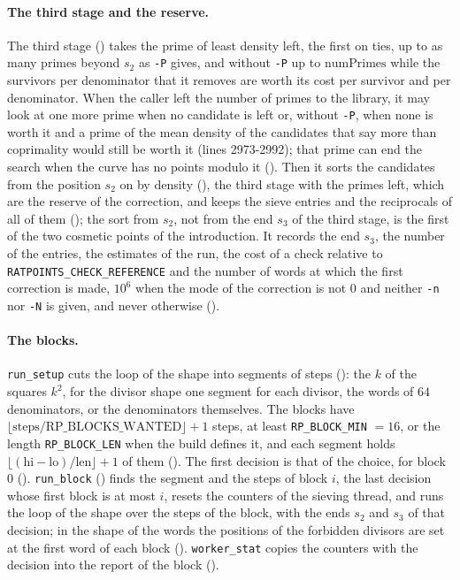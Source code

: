 \paragraph{The third stage and the reserve.} The third stage ()
takes the prime of least density left, the first on ties, up to as many primes beyond $s_2$ as
\verb|-P| gives, and without \verb|-P| up to $\mathrm{numPrimes}$ while the survivors per
denominator that it removes are worth its cost per survivor and per denominator. When the caller
left the number of primes to the library, it may look at one more prime when no candidate is left
or, without \verb|-P|, when none is worth it and a prime of the mean density of the candidates that
say more than coprimality would still be worth it (lines 2973-2992); that prime can end the search
when the curve has no points modulo it (). Then it sorts the
candidates from the position $s_2$ on by density (), the third
stage with the primes left, which are the reserve of the correction, and keeps the sieve entries and
the reciprocals of all of them (); the sort from $s_2$, not from
the end $s_3$ of the third stage, is the first of the two cosmetic points of the introduction. It
records the end $s_3$, the number of the entries, the estimates of the run, the cost of a check
relative to \verb|RATPOINTS_CHECK_REFERENCE| and the number of words at which the first correction
is made, $10^6$ when the mode of the correction is not $0$ and neither \verb|-n| nor \verb|-N| is
given, and never otherwise ().

\paragraph{The blocks.} \verb|run_setup| cuts the loop of the shape into segments of steps
(): the $k$ of the squares $k^2$, for the divisor shape one
segment for each divisor, the words of $64$ denominators, or the denominators themselves. The blocks
have $\lfloor \mathrm{steps}/\mathrm{RP\_BLOCKS\_WANTED} \rfloor + 1$ steps, at least
\verb|RP_BLOCK_MIN| $= 16$, or the length \verb|RP_BLOCK_LEN| when the build defines it, and each
segment holds $\lfloor (\mathrm{hi} - \mathrm{lo})/\mathrm{len} \rfloor + 1$ of them
(). The first decision is that of the choice, for block $0$
(). \verb|run_block| () finds
the segment and the steps of block $i$, the last decision whose first block is at most $i$, resets
the counters of the sieving thread, and runs the loop of the shape over the steps of the block, with
the ends $s_2$ and $s_3$ of that decision; in the shape of the words the positions of the forbidden
divisors are set at the first word of each block ().
\verb|worker_stat| copies the counters with the decision into the report of the block
().

